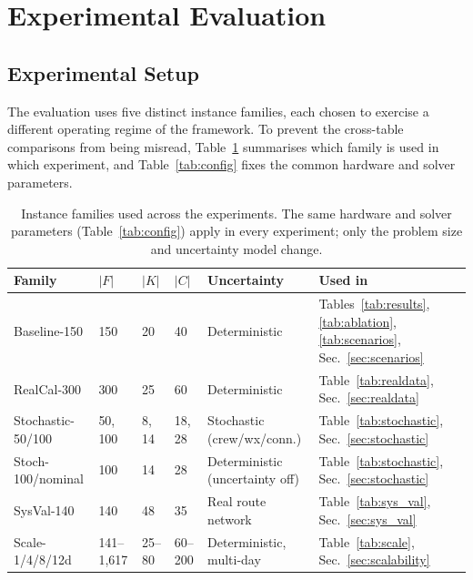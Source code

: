 \documentclass[12pt,number]{elsarticle}
\begin{document}
\section{Experimental Evaluation}
\label{sec:experiments}

\subsection{Experimental Setup}

The evaluation uses five distinct instance families, each chosen to exercise a different operating regime of the framework. To prevent the cross-table comparisons from being misread, Table~\ref{tab:instances} summarises which family is used in which experiment, and Table~\ref{tab:config} fixes the common hardware and solver parameters.

\begin{table}[H]
\centering
\footnotesize
\caption{Instance families used across the experiments. The same hardware and solver parameters (Table~\ref{tab:config}) apply in every experiment; only the problem size and uncertainty model change.}
\label{tab:instances}
\begin{tabular}{@{}p{2.0cm}p{1.0cm}p{1.0cm}p{1.0cm}p{2.0cm}p{3.0cm}@{}}
\toprule
\textbf{Family} & $|F|$ & $|K|$ & $|C|$ & \textbf{Uncertainty} & \textbf{Used in} \\
\midrule
Baseline-150       & 150  & 20 & 40 & Deterministic & Tables~\ref{tab:results}, \ref{tab:ablation}, \ref{tab:scenarios}, Sec.~\ref{sec:scenarios} \\
RealCal-300        & 300  & 25 & 60 & Deterministic & Table~\ref{tab:realdata}, Sec.~\ref{sec:realdata} \\
Stochastic-50/100  & 50, 100 & 8, 14 & 18, 28 & Stochastic (crew/wx/conn.) & Table~\ref{tab:stochastic}, Sec.~\ref{sec:stochastic} \\
Stoch-100/nominal  & 100  & 14 & 28 & Deterministic (uncertainty off) & Table~\ref{tab:stochastic}, Sec.~\ref{sec:stochastic} \\
SysVal-140         & 140  & 48 & 35 & Real route network & Table~\ref{tab:sys_val}, Sec.~\ref{sec:sys_val} \\
Scale-1/4/8/12d    & 141--1{,}617 & 25--80 & 60--200 & Deterministic, multi-day & Table~\ref{tab:scale}, Sec.~\ref{sec:scalability} \\
\bottomrule
\end{tabular}
\end{table}
\end{document}
